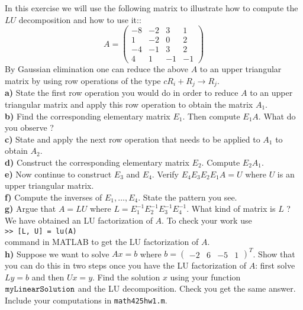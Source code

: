 \documentclass[11pt]{amsart}
\theoremstyle{definition}  %
\begin{document}
 In this exercise we will use the following matrix to illustrate how to compute the $LU$ decomposition and how to use it::
$$ A = \left( \begin{array}{rrrr} -8 & -2 & 3 & 1 \\  1 & -2 &  0  & 2 \\ -4 & -1 & 3 & 2 \\ 4 & 1 & -1 & -1 \end{array} \right)$$
By Gaussian elimination one can reduce the above $A$ to an upper triangular matrix by using  row operations of the type $cR_i + R_j \rightarrow R_j$. \\
{\bf a)} State the first row operation you would do in order to reduce $A$ to an upper triangular matrix and apply this row operation to 
obtain the matrix $A_1$.\\
{\bf b)} Find the corresponding elementary matrix $E_1$. Then compute $E_1A$.  What do you observe ? \\
{\bf c)}  State and apply the next row operation that needs to be applied to $A_1$ to obtain $A_2$. \\
{\bf d)}  Construct the corresponding elementary matrix $E_2$.  Compute $E_2 A_1$.  \\
{\bf e)} Now continue to construct $E_3$ and $ E_4$. Verify $E_4E_3E_2E_1A  = U$ where $U$ is an upper triangular matrix. \\
{\bf f)} Compute the inverses of $E_1, \ldots, E_4$. State the pattern you see. \\
{\bf g)} Argue that $A = LU$ where $L= E_1^{-1}E_2^{-1} E_3^{-1}E_4^{-1}$.  What kind of matrix is $L$ ? \\
We have obtained
an LU factorization of $A$.  To check your work use \\
{\tt >> [L, U] = lu(A)} \\
command in MATLAB to get the LU factorization of $A$. \\
{\bf h)} Suppose we want to solve $Ax = b$ where $b = \left( \begin{array}{rrrr} -2 & 6 &  -5 &  1 \end{array} \right)^T$. Show that you can 
do this in two steps once you have the LU factorization of $A$:  first solve $Ly = b$ and then $Ux = y$. Find the solution $x$ using
your function ${\tt myLinearSolution}$ and the LU decomposition. Check you get the same answer. Include your computations in {\tt math425hw1.m}. \\
\end{document}
